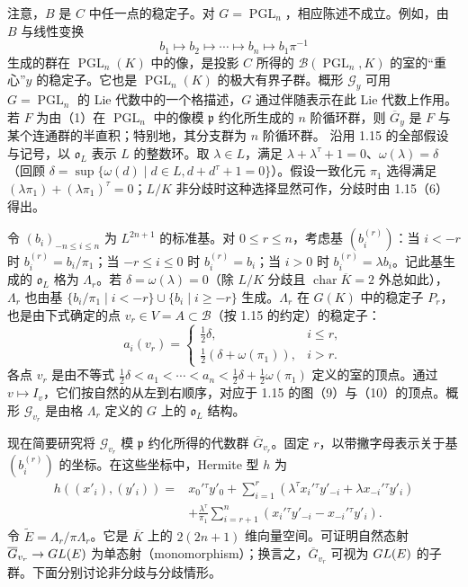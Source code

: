 注意，$B$ 是 $C$ 中任一点的稳定子。对 $G=\operatorname{PGL}_n$，相应陈述不成立。例如，由 $B$ 与线性变换
\[
b_1\longmapsto b_2\longmapsto\cdots\longmapsto b_n\longmapsto b_1\pi^{-1}\tag{3.10(1)}
\]
生成的群在 $\operatorname{PGL}_n(K)$ 中的像，是投影 $C$ 所得的 $\mathscr B(\operatorname{PGL}_n,K)$ 的室的“重心”$y$ 的稳定子。它也是 $\operatorname{PGL}_n(K)$ 的极大有界子群。概形 $\mathscr G_y$ 可用 $G=\operatorname{PGL}_n$ 的 Lie 代数中的一个格描述，$G$ 通过伴随表示在此 Lie 代数上作用。若 $F$ 为由（1）在 $\operatorname{PGL}_n$ 中的像模 $\mathfrak p$ 约化所生成的 $n$ 阶循环群，则 $\overline G_y$ 是 $F$ 与某个连通群的半直积；特别地，其分支群为 $n$ 阶循环群。
沿用 1.15 的全部假设与记号，以 $\mathfrak o_L$ 表示 $L$ 的整数环。取 $\lambda\in L$，满足 $\lambda+\lambda^\tau+1=0$、$\omega(\lambda)=\delta$（回顾 $\delta=\sup\{\omega(d)\mid d\in L,d+d^\tau+1=0\}$）。假设一致化元 $\pi_1$ 选得满足 $(\lambda\pi_1)+(\lambda\pi_1)^\tau=0$；$L/K$ 非分歧时这种选择显然可作，分歧时由 1.15（6）得出。

令 $(b_i)_{-n\leq i\leq n}$ 为 $L^{2n+1}$ 的标准基。对 $0\leq r\leq n$，考虑基 $(b_i^{(r)})$：当 $i<-r$ 时 $b_i^{(r)}=b_i/\pi_1$；当 $-r\leq i\leq0$ 时 $b_i^{(r)}=b_i$；当 $i>0$ 时 $b_i^{(r)}=\lambda b_i$。记此基生成的 $\mathfrak o_L$ 格为 $\Lambda_r$。若 $\delta=\omega(\lambda)=0$（除 $L/K$ 分歧且 $\operatorname{char}\overline K=2$ 外总如此），$\Lambda_r$ 也由基 $\{b_i/\pi_1\mid i<-r\}\cup\{b_i\mid i\geq-r\}$ 生成。$\Lambda_r$ 在 $G(K)$ 中的稳定子 $P_r$，也是由下式确定的点 $v_r\in V=A\subset\mathscr B$（按 1.15 的约定）的稳定子：
\[
a_i(v_r)=\begin{cases}\frac12\delta,&i\leq r,\\\frac12(\delta+\omega(\pi_1)),&i>r.\end{cases}
\]
各点 $v_r$ 是由不等式 $\frac12\delta<a_1<\cdots<a_n<\frac12\delta+\frac12\omega(\pi_1)$ 定义的室的顶点。通过 $v\mapsto I_v$，它们按自然的从左到右顺序，对应于 1.15 的图（9）与（10）的顶点。概形 $\mathscr G_{v_r}$ 是由格 $\Lambda_r$ 定义的 $G$ 上的 $\mathfrak o_L$ 结构。

现在简要研究将 $\mathscr G_{v_r}$ 模 $\mathfrak p$ 约化所得的代数群 $\overline G_{v_r}$。固定 $r$，以带撇字母表示关于基 $(b_i^{(r)})$ 的坐标。在这些坐标中，Hermite 型 $h$ 为
\[
\begin{aligned}
h((x'_i),(y'_i))={}&x_0'{}^\tau y'_0+
\sum_{i=1}^r(\lambda^\tau x_i'{}^\tau y'_{-i}+\lambda x_{-i}'{}^\tau y'_i)\\
&+\frac{\lambda^\tau}{\pi_1}\sum_{i=r+1}^n(x_i'{}^\tau y'_{-i}-x_{-i}'{}^\tau y'_i).
\end{aligned}
\]
令 $\widetilde E=\Lambda_r/\pi\Lambda_r$。它是 $\overline K$ 上的 $2(2n+1)$ 维向量空间。可证明自然态射 $\overline G_{v_r}\to GL(E)$ 为单态射（monomorphism）；换言之，$\overline G_{v_r}$ 可视为 $GL(E)$ 的子群。下面分别讨论非分歧与分歧情形。

